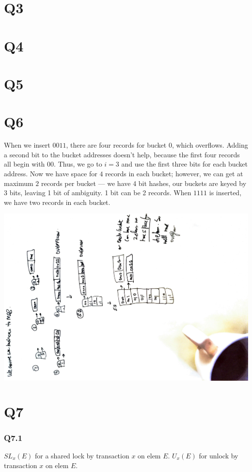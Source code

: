 \documentclass{article}
\begin{document}
\section{Q3}
\section{Q4}
\section{Q5}
\section{Q6}

When we insert $0011$, there are four records for bucket 0, which overflows.
Adding a second bit to the bucket addresses doesn't help, because the first
four records all begin with $00$. Thus, we go to $i = 3$ and use the first three
bits for each bucket address. Now we have space for $4$ records in each bucket;
however, we can get at maximum $2$ records per bucket --- we have 4 bit hashes,
our buckets are keyed by 3 bits, leaving 1 bit of ambiguity. 1 bit 
can be 2 records. When $1111$ is inserted, we have two records in each bucket.

\includegraphics[width=\textwidth, angle=270]{db-q6.pdf}

\section{Q7}
\subsubsection{Q7.1}
$SL_x(E)$ for a shared lock by transaction $x$ on elem $E$. $U_x(E)$ for
unlock by transaction $x$ on elem $E$.
\end{document}
